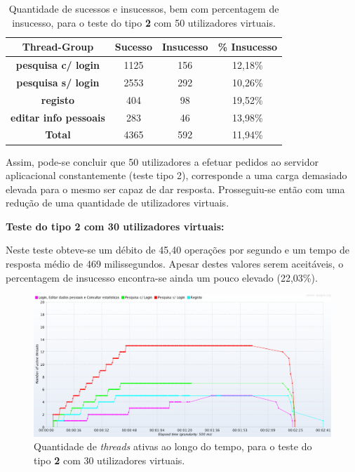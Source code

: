 \begin{table}[H]
\centering
\caption{Quantidade de sucessos e insucessos, bem com percentagem de insucesso, para o teste do tipo \textbf{2} com 50 utilizadores virtuais.}
\begin{tabular}{cccc}
\hline
\rowcolor[HTML]{EFEFEF} 
\textbf{Thread-Group}                  & \textbf{Sucesso} & \textbf{Insucesso} & \textbf{\% Insucesso} \\ \hline
\textbf{pesquisa c/ login}             & 1125             & 156                & 12,18\%               \\
\textbf{pesquisa s/ login}             & 2553             & 292                & 10,26\%               \\
\textbf{registo}                       & 404              & 98                 & 19,52\%               \\
\textbf{editar info pessoais}          & 283              & 46                 & 13,98\%               \\ \hline
\cellcolor[HTML]{EFEFEF}\textbf{Total} & 4365             & 592                & 11,94\%               \\ \hline
\end{tabular}
\end{table}

Assim, pode-se concluir que 50 utilizadores a efetuar pedidos ao servidor aplicacional constantemente (teste tipo 2), corresponde a uma carga demasiado elevada para o mesmo ser capaz de dar resposta. Prosseguiu-se então com uma redução de uma quantidade de utilizadores virtuais.

\vspace{0.5cm}
\noindent\textbf{Teste do tipo 2 com 30 utilizadores virtuais:}

Neste teste obteve-se um débito de 45,40 operações por segundo e um tempo de resposta médio de 469 milissegundos. Apesar destes valores serem aceitáveis, o percentagem de insucesso encontra-se ainda um pouco elevado (22,03\%). 

\begin{figure}[H]
    \centering
    \includegraphics[width=1\textwidth]{images/Testes/3PC_RU_30T.png}
    \caption{Quantidade de \textit{threads} ativas ao longo do tempo, para o teste do tipo \textbf{2} com 30 utilizadores virtuais.}
    \label{fig:3PC_RU_30_threads}
\end{figure}

